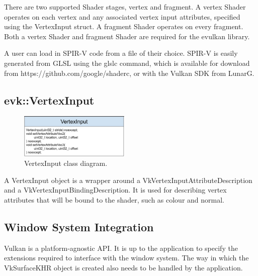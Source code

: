 \documentclass[12pt]{report}
\newcommand{\imagewidth}{0.47\textwidth}
\theoremstyle{definition}
\begin{document}
        There are two supported Shader stages, vertex and fragment. A
        vertex Shader operates on each vertex and any associated vertex
        input attributes, specified using the VertexInput struct. A
        fragment Shader operates on every fragment. Both a vertex Shader
        and fragment Shader are required for the evulkan library.

        A user can load in SPIR-V code from a file of their choice. SPIR-V is
        easily generated from GLSL using the glslc command, which is
        available for download from https://github.com/google/shaderc, or
        with the Vulkan SDK from LunarG.

      \subsection{evk::VertexInput}

        \begin{figure}[h]
          \centering
          \includegraphics[width=\imagewidth]{images/class_vertexinput.png}
          \caption{VertexInput class diagram.}
          \label{fig:class_vertexinput}
        \end{figure}

        A VertexInput object is a wrapper around a VkVertexInputAttributeDescription
        and a VkVertexInputBindingDescription. It is used for describing vertex
        attributes that will be bound to the shader, such as colour and normal.

      \subsection{Window System Integration}

        Vulkan is a platform-agnostic API. It is up to the application to
        specify the extensions required to interface with the window system.
        The way in which the VkSurfaceKHR object is created also needs to be
        handled by the application. \\
\end{document}
